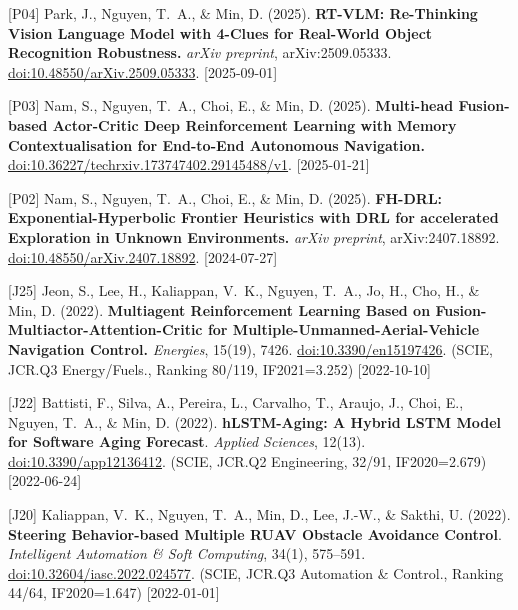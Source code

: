 {\begin{pubenumerate}
  \item {\color{blue}[P04]} Park, J., Nguyen, T.\ A., \& Min, D. (2025). 
  \textbf{RT-VLM: Re-Thinking Vision Language Model with 4-Clues for Real-World Object Recognition Robustness.} 
  \textit{arXiv preprint}, arXiv:2509.05333. 
  \href{https://doi.org/10.48550/arXiv.2509.05333}{doi:10.48550/arXiv.2509.05333}. [2025-09-01]

\item {\color{blue}[P03]} Nam, S., Nguyen, T.\ A., Choi, E., \& Min, D. (2025). 
  \textbf{Multi-head Fusion-based Actor-Critic Deep Reinforcement Learning with Memory Contextualisation for End-to-End Autonomous Navigation.} 
  \href{https://doi.org/10.36227/techrxiv.173747402.29145488/v1}{doi:10.36227/techrxiv.173747402.29145488/v1}. [2025-01-21]

\item {\color{blue}[P02]} Nam, S., Nguyen, T.\ A., Choi, E., \& Min, D. (2025). 
  \textbf{FH-DRL: Exponential-Hyperbolic Frontier Heuristics with DRL for accelerated Exploration in Unknown Environments.} 
  \textit{arXiv preprint}, arXiv:2407.18892. 
  \href{https://doi.org/10.48550/arXiv.2407.18892}{doi:10.48550/arXiv.2407.18892}. [2024-07-27]

\item {\color{blue}[J25]} Jeon, S., Lee, H., Kaliappan, V.\ K., Nguyen, T.\ A., Jo, H., Cho, H., \& Min, D. (2022). \textbf{Multiagent Reinforcement Learning Based on Fusion-Multiactor-Attention-Critic for Multiple-Unmanned-Aerial-Vehicle Navigation Control.} \textit{Energies}, 15(19), 7426. \href{https://doi.org/10.3390/en15197426}{doi:10.3390/en15197426}. (SCIE, JCR.Q3 Energy/Fuels., Ranking 80/119, IF2021=3.252) [2022-10-10]

\item {\color{blue}[J22]} Battisti, F., Silva, A., Pereira, L., Carvalho, T., Araujo, J., Choi, E., Nguyen, T.\ A., \& Min, D. (2022). \textbf{hLSTM-Aging: A Hybrid LSTM Model for Software Aging Forecast}. \textit{Applied Sciences}, 12(13). \href{https://doi.org/10.3390/app12136412}{doi:10.3390/app12136412}. (SCIE, JCR.Q2 Engineering, 32/91, IF2020=2.679) [2022-06-24]

\item {\color{blue}[J20]} Kaliappan, V.\ K., Nguyen, T.\ A., Min, D., Lee, J.-W., \& Sakthi, U. (2022). \textbf{Steering Behavior-based Multiple RUAV Obstacle Avoidance Control}. \textit{Intelligent Automation \& Soft Computing}, 34(1), 575--591. \href{https://doi.org/10.32604/iasc.2022.024577}{doi:10.32604/iasc.2022.024577}. (SCIE, JCR.Q3 Automation \& Control., Ranking 44/64, IF2020=1.647) [2022-01-01]


\end{pubenumerate}}
